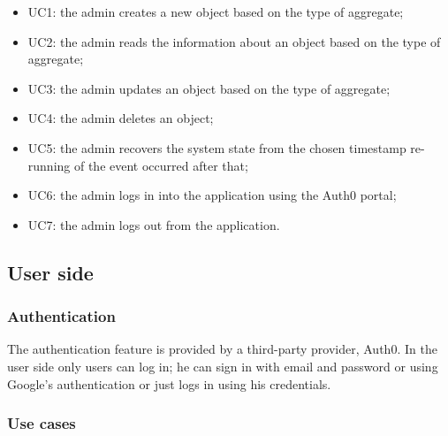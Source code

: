 \begin{itemize}
	\item UC1: the admin creates a new object based on the type of aggregate;
	\item UC2: the admin reads the information about an object based on the type of aggregate;
	\item UC3: the admin updates an object based on the type of aggregate;
	\item UC4: the admin deletes an object;
	\item UC5: the admin recovers the system state from the chosen timestamp re-running of the event occurred after that; 
	\item UC6: the admin logs in into the application using the Auth0 portal;
	\item UC7: the admin logs out from the application.
\end{itemize}
	

\subsection{User side}
\subsubsection{Authentication}
The authentication feature is provided by a third-party provider, Auth0. In the user side only users can log in; he can sign in with email and password or using Google's authentication or just logs in using his credentials.
\subsubsection{Use cases}

